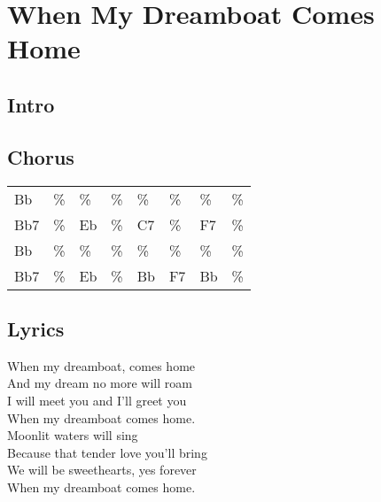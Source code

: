 \section{When My Dreamboat Comes Home}


\subsection*{Intro}


\subsection*{Chorus}


\begin{tabular}{l l l l l l l l}
Bb & \% & \% & \% & \% & \% & \% & \% \\ 
Bb7 & \% & Eb & \% & C7 & \% & F7 & \% \\ 
Bb & \% & \% & \% & \% & \% & \% & \% \\ 
Bb7 & \% & Eb & \% & Bb & F7 & Bb & \% \\ 
\end{tabular}


\subsection*{Lyrics}


When my dreamboat, comes home \\ 
And my dream no more will roam \\ 
I will meet you and I'll greet you \\ 
When my dreamboat comes home. \\ 
Moonlit waters will sing \\ 
Because that tender love you'll bring \\ 
We will be sweethearts, yes forever \\ 
When my dreamboat comes home. \\ 
